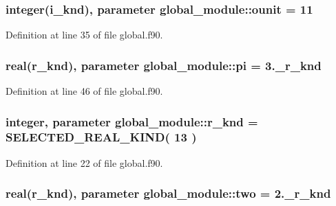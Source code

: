 \hypertarget{classglobal__module_a3d8941f8c329162cde48206e253955f5}{
\subsubsection[{ounit}]{\setlength{\rightskip}{0pt plus 5cm}integer({\bf i\-\_\-knd}), parameter global\-\_\-module\-::ounit = 11}}\label{classglobal__module_a3d8941f8c329162cde48206e253955f5}


Definition at line 35 of file global.\-f90.

\hypertarget{classglobal__module_ac248f55c9fa522378b386ab9456aec4e}{
\subsubsection[{pi}]{\setlength{\rightskip}{0pt plus 5cm}real({\bf r\-\_\-knd}), parameter global\-\_\-module\-::pi = 3.\-\_\-r\-\_\-knd}}\label{classglobal__module_ac248f55c9fa522378b386ab9456aec4e}


Definition at line 46 of file global.\-f90.

\hypertarget{classglobal__module_ab88bc58495adcaa0c39aac0c541fe8c8}{
\subsubsection[{r\-\_\-knd}]{\setlength{\rightskip}{0pt plus 5cm}integer, parameter global\-\_\-module\-::r\-\_\-knd = S\-E\-L\-E\-C\-T\-E\-D\-\_\-\-R\-E\-A\-L\-\_\-\-K\-I\-N\-D( 13 )}}\label{classglobal__module_ab88bc58495adcaa0c39aac0c541fe8c8}


Definition at line 22 of file global.\-f90.

\hypertarget{classglobal__module_ae882a53fa5147b5a17b1de231a9edc1e}{
\subsubsection[{two}]{\setlength{\rightskip}{0pt plus 5cm}real({\bf r\-\_\-knd}), parameter global\-\_\-module\-::two = 2.\-\_\-r\-\_\-knd}}\label{classglobal__module_ae882a53fa5147b5a17b1de231a9edc1e}


